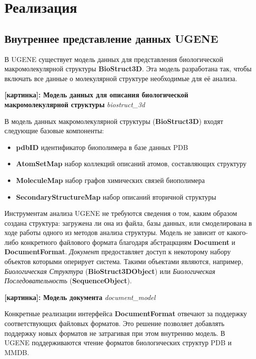 \documentclass[a4paper, 12pt, titlepage, utf8]{extarticle}
\let\oldsection\section         %
\renewcommand{\section}{\newpage\oldsection}
\newcommand{\ruclass}{\textit}
\newcommand{\class}{\textbf}
\newcommand{\myimage}[2]{   
    \begin{center} \textbf{[картинка]: #1} \textit{#2} \end{center} 
}
\begin{document}
\section{Реализация}
\subsection{Внутреннее представление данных UGENE}
В UGENE существует модель данных для представления биологической макромолекулярной структуры \class{BioStruct3D}. Эта модель разработана так, чтобы включать все данные о молекулярной структуре необходимые для её анализа.

\myimage{Модель данных для описания биологической макромолекулярной структуры}{biostruct\_3d}

В модель данных макромолекулярной структуры (\class{BioStruct3D}) входят следующие базовые компоненты:
\begin{itemize}
    \item \textbf{pdbID} идентификатор биополимера в базе данных PDB 
    \item \textbf{AtomSetMap} набор коллекций описаний атомов, составляющих структуру
    \item \textbf{MoleculeMap} набор графов химических связей биополимера 
    \item \textbf{SecondaryStructureMap} набор описаний вторичной структуры
\end{itemize}

Инструментам анализа UGENE не требуются сведения о том, каким образом создана структура: загружена ли она из файла, базы данных, или смоделирована в ходе работы одного из методов анализа структуры. Модель не зависит от какого-либо конкретного файлового формата  благодаря абстрацкциям \class{Document} и \class{DocumentFormat}. \ruclass{Документ} предоставляет доступ к некоторому набору объектов которыми оперирует система. Такими объектами являются, например, \ruclass{Биологическая Структура} (\class{BioStruct3DObject}) или \ruclass{Биологическая Последовательность} (\class{SequenceObject}). 

\myimage{Модель документа}{document\_model}

Конкретные реализации интерфейса \class{DocumentFormat} отвечают за поддержку соответствующих файловых форматов. Это решение позволяет добавлять поддержку новых форматов не затрагивая при этом внутренню модель. В UGENE поддерживаются чтение форматов биологических структур PDB и MMDB.
\end{document}
